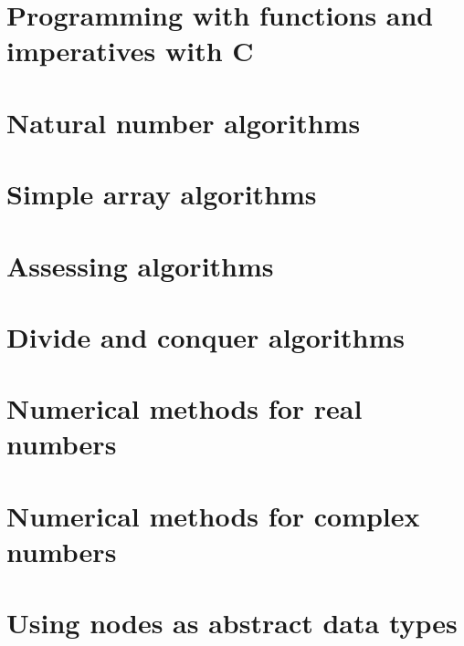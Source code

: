 \documentclass[oneside]{book}
\begin{document}
\part{Programming with functions and imperatives with C}
















\part{Natural number algorithms}





\part{Simple array algorithms}



\part{Assessing algorithms}



\part{Divide and conquer algorithms}


\part{Numerical methods for real numbers}







\part{Numerical methods for complex numbers}


\part{Using nodes as abstract data types}



\end{document}
